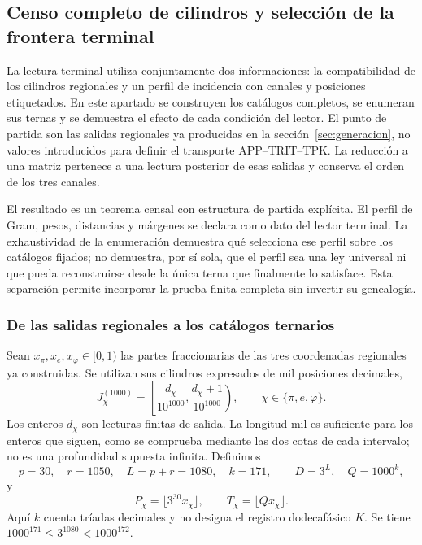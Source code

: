 \subsection{Censo completo de cilindros y selección de la frontera terminal}
\label{censo:terminal-completo}

La lectura terminal utiliza conjuntamente dos informaciones: la compatibilidad
de los cilindros regionales y un perfil de incidencia con canales y posiciones
etiquetados. En este apartado se construyen los catálogos completos, se
enumeran sus ternas y se demuestra el efecto de cada condición del lector.
El punto de partida son las salidas regionales ya producidas en la
sección~\ref{sec:generacion}, no valores introducidos para definir el
transporte APP--TRIT--TPK. La reducción a una matriz pertenece a una lectura
posterior de esas salidas y conserva el orden de los tres canales.

El resultado es un teorema censal con estructura de partida explícita.
El perfil de Gram, pesos, distancias y márgenes se declara como dato del
lector terminal. La exhaustividad de la enumeración demuestra qué selecciona
ese perfil sobre los catálogos fijados; no demuestra, por sí sola, que el
perfil sea una ley universal ni que pueda reconstruirse desde la única terna
que finalmente lo satisface. Esta separación permite incorporar la prueba
finita completa sin invertir su genealogía.

\subsubsection{De las salidas regionales a los catálogos ternarios}

Sean \(x_\pi,x_e,x_\varphi\in[0,1)\) las partes fraccionarias de las
tres coordenadas regionales ya construidas. Se utilizan sus cilindros
expresados de mil posiciones decimales,
\[
 J_\chi^{(1000)}=
 \left[\frac{d_\chi}{10^{1000}},
       \frac{d_\chi+1}{10^{1000}}\right),
 \qquad \chi\in\{\pi,e,\varphi\}.
\]
Los enteros \(d_\chi\) son lecturas finitas de salida. La longitud mil
es suficiente para los enteros que siguen, como se comprueba mediante las
dos cotas de cada intervalo; no es una profundidad supuesta infinita.
Definimos
\begin{equation}
 p=30,\quad r=1050,\quad L=p+r=1080,\quad k=171,
 \qquad D=3^L,\quad Q=1000^k,
 \label{censo:parametros}
\end{equation}
y
\[
 P_\chi=\lfloor3^{30}x_\chi\rfloor,\qquad
 T_\chi=\lfloor Qx_\chi\rfloor.
\]
Aquí \(k\) cuenta tríadas decimales y no designa el registro dodecafásico
\(K\). Se tiene \(1000^{171}\leq3^{1080}<1000^{172}\).

